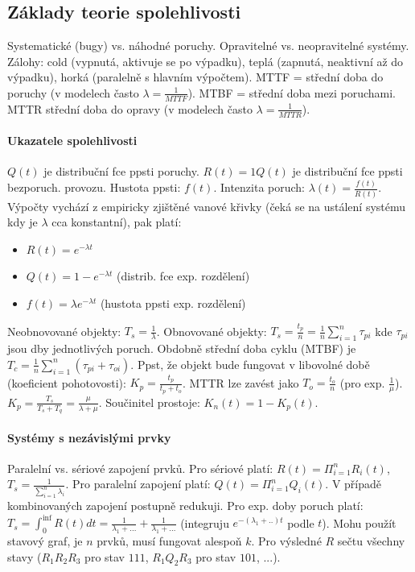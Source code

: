 \documentclass[11pt,a4paper]{scrartcl}
\begin{document}
	\subsection{Základy teorie spolehlivosti} Systematické (bugy) vs. náhodné poruchy. Opravitelné vs. neopravitelné systémy. Zálohy: cold (vypnutá, aktivuje se po výpadku), teplá (zapnutá, neaktivní až do výpadku), horká (paralelně s hlavním výpočtem). MTTF = střední doba do poruchy (v modelech často $\lambda = \frac{1}{MTTF}$). MTBF = střední doba mezi poruchami. MTTR střední doba do opravy (v modelech často $\lambda = \frac{1}{MTTR}$).
	
	\paragraph{Ukazatele spolehlivosti} $Q(t)$ je distribuční fce ppsti poruchy. $R(t) = 1 Q(t)$ je distribuční fce ppsti bezporuch. provozu. Hustota ppsti: $f(t)$. Intenzita poruch: $\lambda(t) = \frac{f(t)}{R(t)}$. Výpočty vychází z empiricky zjištěné vanové křivky (čeká se na ustálení systému kdy je $\lambda$ cca konstantní), pak platí:
	\begin{itemize}
		\item $R(t) = e^{-\lambda t}$
		\item $Q(t) = 1 - e^{-\lambda t}$ (distrib. fce exp. rozdělení)
		\item $f(t) = \lambda e^{-\lambda t}$ (hustota ppsti exp. rozdělení)
	\end{itemize}

   Neobnovované objekty: $T_s = \frac{1}{\lambda}$. Obnovované objekty: $T_s = \frac{t_p}{n} = \frac{1}{n} \sum_{i=1}^{n} \tau_{pi}$ kde $\tau_{pi}$ jsou dby jednotlivých poruch. Obdobně střední doba cyklu (MTBF) je $T_c = \frac{1}{n} \sum_{i=1}^{n} (\tau_{pi} + \tau_{oi})$. Ppst, že objekt bude fungovat v libovolné době (koeficient pohotovosti): $K_p = \frac{t_p}{t_p + t_o}$. MTTR lze zavést jako $T_o = \frac{t_o}{n}$ (pro exp. $\frac{1}{\mu}$). $K_p = \frac{T_s}{T_s+T_q}=\frac{\mu}{\lambda + \mu}$. Součinitel prostoje: $K_n(t) = 1-K_p(t)$.
	
	\paragraph{Systémy s nezávislými prvky} Paralelní vs. sériové zapojení prvků. Pro sériové platí: $R(t) = \Pi_{i=1}^n R_i(t)$, $T_s = \frac{1}{\sum_{i=1}^{n}\lambda_i}$. Pro paralelní zapojení platí: $Q(t) = \Pi_{i=1}^n Q_i(t)$. V případě kombinovaných zapojení postupně redukuji. Pro exp. doby poruch platí: $T_s=\int_{0}^{\inf} R(t)dt = \frac{1}{\lambda_1+...} + \frac{1}{\lambda_1+...}$ (integruju $e^{-(\lambda_1+..)t}$ podle $t$). Mohu použít stavový graf, je $n$ prvků, musí fungovat alespoň $k$. Pro výsledné $R$ sečtu všechny stavy ($R_1 R_2 R_3$ pro stav $111$, $R_1Q_2R_3$ pro stav $101$, ...).
	
\end{document}
